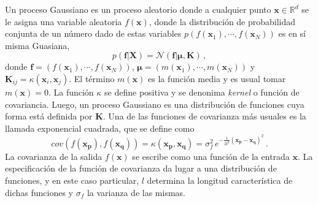 \begin{comment}
El método de optimización bayesiana por excelencia es la regresión 
mediante procesos gaussianos (\acs{gp}). Existen otros métodos, tales 
como la estimación de arbol de Parzen (\acs{tpe}), que hemos estudiado 
inicialmente pero que no serán explorados en este trabajo. 

Dado que la función objetivo es desconocida, la estrategia bayesiana 
consiste en suponer que la función es aleatoria y definir una 
distribución previa sobre la función. La distribución previa definida 
debe contar con información mínima sobre el comportamiento de la función. 
Luego de analizar las evaluaciones iniciales, el prior es actualizado y 
define una distribución posterior sobre la función objetivo o costo. A 
su vez, la distribución posterior permite construir una función de 
adquisición, que determina el siguiente punto a evaluar. 
\end{comment}

Un proceso Gaussiano es un proceso aleatorio donde a cualquier punto 
$\mathbf{x}\in \mathbb{R}^d$ se le asigna una variable aleatoria 
$f(\mathbf{x})$, donde la distribución de probabilidad conjunta de un 
número dado de estas variables $p(f(\mathbf{x}_1),\cdots,f(\mathbf{x}_N))$
es en sí misma Guasiana,
\begin{equation}
p(\mathbf{f}|\mathbf{X})
=\mathcal{N}(\mathbf{f}|\boldsymbol{\mu},\mathbf{K})\,,
\end{equation}
donde $\mathbf{f}=(f(\mathbf{x}_1),\cdots,f(\mathbf{x}_N))$, 
$\boldsymbol\mu=(m(\mathbf{x}_1),\cdots,m(\mathbf{x}_N))$ y 
$\mathbf{K}_{ij}=\kappa(\mathbf{x}_i,\mathbf{x}_j)$. El término 
$m(\mathbf{x})$ es la función media y es usual tomar $m(\mathbf{x})=0$.
La función $\kappa$ se define positiva y se denonima \textit{kernel}
o función de covariancia. Luego, un proceso Gaussiano es una 
distribución de funciones cuya forma está definida por $\mathbf{K}$.
Una de las funciones de covarianza más usuales es la llamada exponencial
cuadrada, que se define como
\begin{equation}
cov(f(\mathbf{x}_{\mathbf{p}}),f(\mathbf{x}_{\mathbf{q}}))
=\kappa(\mathbf{x}_{\mathbf{p}},\mathbf{x}_{\mathbf{q}})
=\sigma_f^2\,e^{-\frac{1}{2l^2}(\mathbf{x}_{\mathbf{p}}
-\mathbf{x}_{\mathbf{q}})^2}\,.
\end{equation}
La covarianza de la salida $f(\mathbf{x})$ se escribe como una función 
de la entrada $\mathbf{x}$. La especificación de la función de 
covarianza da lugar a una distribución de funciones, y en este caso 
particular, $l$ determina la longitud característica de dichas funciones
y $\sigma_f$ la varianza de las mismas. 

